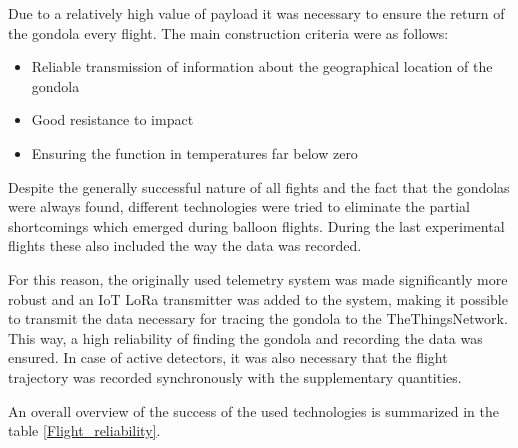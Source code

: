 \documentclass{Rpd}
\begin{document}
Due to a relatively high value of payload it was necessary to ensure the return of the gondola every flight. The main construction criteria were as follows:


\begin{itemize}
\item Reliable transmission of information about the geographical location of the gondola
\item Good resistance to impact
\item Ensuring the function in temperatures far below zero
\end{itemize}


Despite the generally successful nature of all fights and the fact that the gondolas were always found, different technologies were tried to eliminate the partial shortcomings which emerged during balloon flights. During the last experimental flights these also included the way the data was recorded.

For this reason, the originally used telemetry system was made significantly more robust and an IoT LoRa transmitter was added to the system, making it possible to transmit the data necessary for tracing the gondola to the TheThingsNetwork. This way, a high reliability of finding the gondola and recording the data was ensured. In case of active detectors, it was also necessary that the flight trajectory was recorded synchronously with the supplementary quantities.


An overall overview of the success of the used technologies is summarized in the table \ref{Flight_reliability}.
\end{document}
